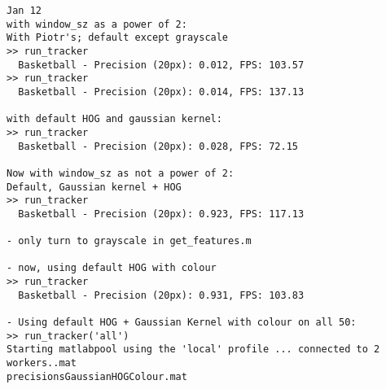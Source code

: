 \begin{lstlisting}
Jan 12
with window_sz as a power of 2:
With Piotr's; default except grayscale
>> run_tracker
  Basketball - Precision (20px): 0.012, FPS: 103.57
>> run_tracker
  Basketball - Precision (20px): 0.014, FPS: 137.13
  
with default HOG and gaussian kernel:
>> run_tracker
  Basketball - Precision (20px): 0.028, FPS: 72.15
  
Now with window_sz as not a power of 2:
Default, Gaussian kernel + HOG
>> run_tracker
  Basketball - Precision (20px): 0.923, FPS: 117.13
  
- only turn to grayscale in get_features.m

- now, using default HOG with colour
>> run_tracker
  Basketball - Precision (20px): 0.931, FPS: 103.83

- Using default HOG + Gaussian Kernel with colour on all 50:
>> run_tracker('all')
Starting matlabpool using the 'local' profile ... connected to 2 workers..mat
precisionsGaussianHOGColour.mat


\end{lstlisting}
